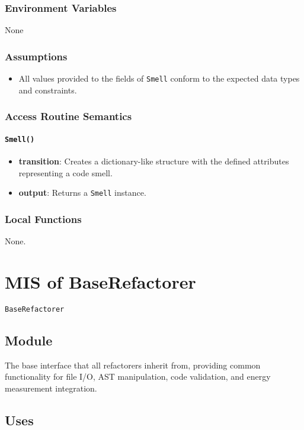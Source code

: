 \documentclass[12pt, titlepage]{article}
\begin{document}
\subsubsection{Environment Variables}
None

\subsubsection{Assumptions}
\begin{itemize}
  \item All values provided to the fields of \texttt{Smell} conform to the expected data types and constraints.
\end{itemize}

\subsubsection{Access Routine Semantics}

\paragraph{\texttt{Smell()}}
\begin{itemize}
  \item \textbf{transition}: Creates a dictionary-like structure with the defined attributes representing a code smell.
  \item \textbf{output}: Returns a \texttt{Smell} instance.
\end{itemize}

\subsubsection{Local Functions}
None.


\section{MIS of BaseRefactorer} \label{mis:baseR}

\texttt{BaseRefactorer}

\subsection{Module}

The base interface that all refactorers inherit from, providing common functionality for file I/O, AST manipulation, code validation, and energy measurement integration.

\subsection{Uses}
\end{document}

